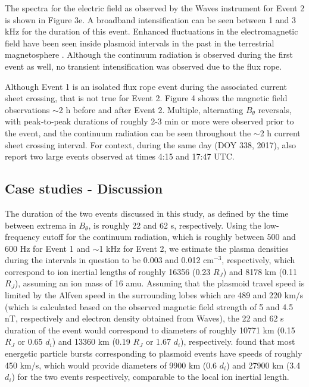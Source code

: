 The spectra for the electric field as observed by the Waves instrument for Event 2 is shown in Figure 3e. A broadband intensification can be seen between 1 and 3 kHz for the duration of this event. Enhanced fluctuations in the electromagnetic field have been seen inside plasmoid intervals in the past in the terrestrial magnetosphere \cite{Kennel1986PlasmaRopes}. Although the continuum radiation is observed during the first event as well, no transient intensification was observed due to the flux rope.

Although Event 1 is an isolated flux rope event during the associated current sheet crossing, that is not true for Event 2. Figure 4 shows the magnetic field observations $\sim$2 h before and after Event 2. Multiple, alternating $B_\theta$ reversals, with peak‐to‐peak durations of roughly 2-3 min or more were observed prior to the event, and the continuum radiation can be seen throughout the $\sim$2 h current sheet crossing interval. For context, during the same day (DOY 338, 2017),  also report two large events observed at times 4:15 and 17:47 UTC.

\subsection{Case studies - Discussion}

The duration of the two events discussed in this study, as defined by the time between extrema in $B_\theta$, is roughly 22 and 62 s, respectively. Using the low-frequency cutoff for the continuum radiation, which is roughly between 500 and 600 Hz for Event 1 and $\sim$1 kHz for Event 2, we estimate the plasma densities \cite{Barnhart2009ElectronSpectra} during the intervals in question to be 0.003 and 0.012 cm$^{-3}$, respectively, which correspond to ion inertial lengths of roughly 16356 (0.23 $R_J$) and 8178 km (0.11 $R_J$), assuming an ion mass of 16 amu. Assuming that the plasmoid travel speed is limited by the Alfven speed in the surrounding lobes \cite{Cowley2015Down-tailMagnetospheres} which are 489 and 220 km/s (which is calculated based on the observed magnetic field strength of 5 and 4.5 nT, respectively and electron density obtained from Waves), the 22 and 62 s duration of the event would correspond to diameters of roughly 10771 km (0.15 $R_J$ or 0.65 $d_i$) and 13360 km (0.19 $R_J$ or 1.67 $d_i$), respectively.  found that most energetic particle bursts corresponding to plasmoid events have speeds of roughly 450 km/s, which would provide diameters of 9900 km (0.6 $d_i$) and 27900 km (3.4 $d_i$) for the two events respectively, comparable to the local ion inertial length.

